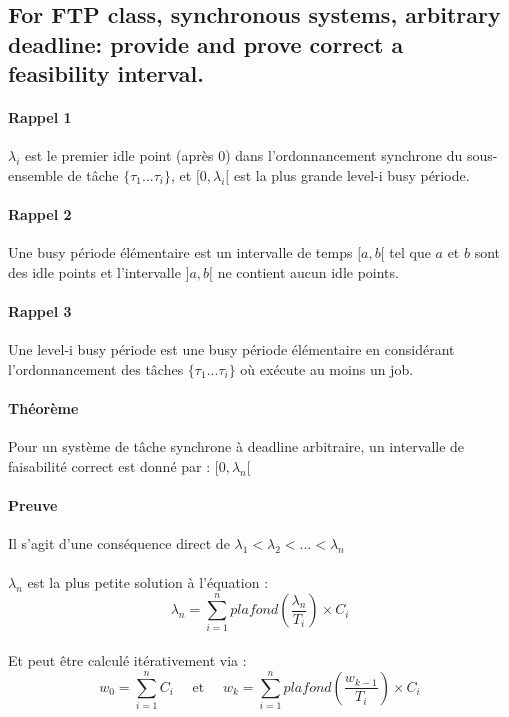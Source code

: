 \subsection{For FTP class, synchronous systems, arbitrary deadline: provide and prove correct a feasibility interval.}
\paragraph{Rappel 1} $\lambda_{i}$ est le premier idle point (après 0) dans l'ordonnancement synchrone du sous-ensemble de tâche $\{\tau_{1}...\tau_{i}\}$, et $[0, \lambda_{i}[$ est la plus grande level-i busy période.
\paragraph{Rappel 2} Une busy période élémentaire est un intervalle de temps $[a, b[$ tel que $a$ et $b$ sont des idle points et l'intervalle $]a,b [$ ne contient aucun idle points.

\paragraph{Rappel 3} Une level-i busy période est une busy période élémentaire en considérant l'ordonnancement des tâches $\{\tau_{1}...\tau_{i}\}$ où \ti exécute au moins un job.

\paragraph{Théorème} Pour un système de tâche synchrone à deadline arbitraire, un intervalle de faisabilité correct est donné par : $[0, \lambda_{n}[$

\paragraph{Preuve} Il s'agit d'une conséquence direct de $\lambda_{1} < \lambda_{2} < ... < \lambda_{n}$
\paragraph{}
$\lambda_{n}$ est la plus petite solution à l'équation :
\begin{equation}
\lambda_{n} = \sum_{i=1}^{n} plafond \left(\frac{\lambda_{n}}{T_{i}} \right) \times C_{i}
\end{equation}
\paragraph{} Et peut être calculé itérativement via :
\begin{equation}
w_{0} = \sum_{i=1}^{n}C_{i} \quad \text{ et } \quad
w_{k} = \sum_{i=1}^{n} plafond\left(\frac{w_{k-1}}{T_{i}} \right) \times C_{i}
\end{equation}


